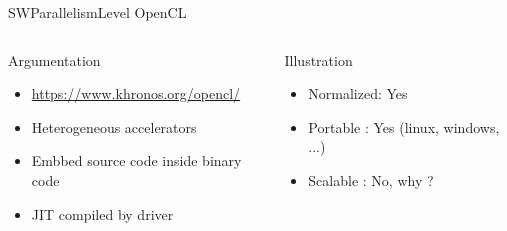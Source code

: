 %
\begin{Frame}{SWParallelismLevel OpenCL}
  \begin{columns}[t]
    \begin{column}{5cm} %
      \begin{block}{Argumentation}
        \begin{itemize}
        \item
          \href{https://www.khronos.org/opencl/}{https://www.khronos.org/opencl/}
        \item Heterogeneous accelerators
        \item Embbed source code inside binary code
        \item JIT compiled by driver
        \end{itemize}
      \end{block} 
    \end{column}
    
    \begin{column}{5cm} %
      \begin{alertblock}{Illustration}
        \begin{itemize}
        \item Normalized: Yes 
        \item Portable : Yes (linux, windows, ...)
        \item Scalable : No, why ?
        \end{itemize}
      \end{alertblock}   
    \end{column}
  \end{columns}  
\end{Frame}


